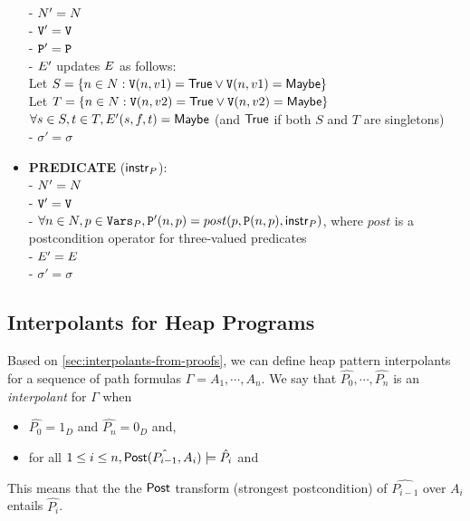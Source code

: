 \begin{itemize}
    - $N' = N$ \\
    - $\mathtt{V}' = \mathtt{V}$ \\
    - $\mathtt{P}' = \mathtt{P}$ \\
    - $E'$ updates $E$ as follows: \\
      \hspace*{1em} Let $S = \{n \in N : \mathtt{V}(n, v1) = \mathsf{True} \vee \mathtt{V}(n, v1) = \mathsf{Maybe}\}$ \\
      \hspace*{1em} Let $T = \{n \in N : \mathtt{V}(n, v2) = \mathsf{True} \vee \mathtt{V}(n, v2) = \mathsf{Maybe}\}$ \\
      \hspace*{1em} $\forall s \in S, t \in T, E'(s,f,t) = \mathsf{Maybe}$ (and $\mathsf{True}$ if both $S$ and $T$ are singletons) \\
    - $\sigma' = \sigma$
  \item \textbf{PREDICATE} ($\mathsf{instr}_P$): \\
    - $N' = N$ \\
    - $\mathtt{V}' = \mathtt{V}$ \\
    - $\forall n \in N, p \in \mathtt{Vars}_P, \mathtt{P}'(n,p) = post(p, \mathtt{P}(n,p), \mathsf{instr}_P)$, where $post$ is a postcondition operator for three-valued predicates \\
    - $E' = E$ \\
    - $\sigma' = \sigma$
\end{itemize}

\subsection{Interpolants for Heap Programs}
\label{sec:heap-interpolants-from-proofs}
Based on \autoref{sec:interpolants-from-proofs}, we can define heap pattern interpolants for a sequence of path formulas $\Gamma = A_1, \cdots , A_n$. We say that $\hat{P_0},\cdots, \hat{P_n}$ is an \textit{interpolant} for $\Gamma$ when

\begin{itemize}
  \item $\hat{P_0} = 1_D$ and $\hat{P_n} = 0_D$ and,
  \item for all $1 \leq i \leq n, \mathsf{Post}(\hat{P_{i-1}}, A_i) \models \hat{P_i}$ and
\end{itemize}

This means that the the $\mathsf{Post}$ transform (strongest postcondition) of $\hat{P_{i-1}}$ over $A_i$ entails $\hat{P_{i}}$.

